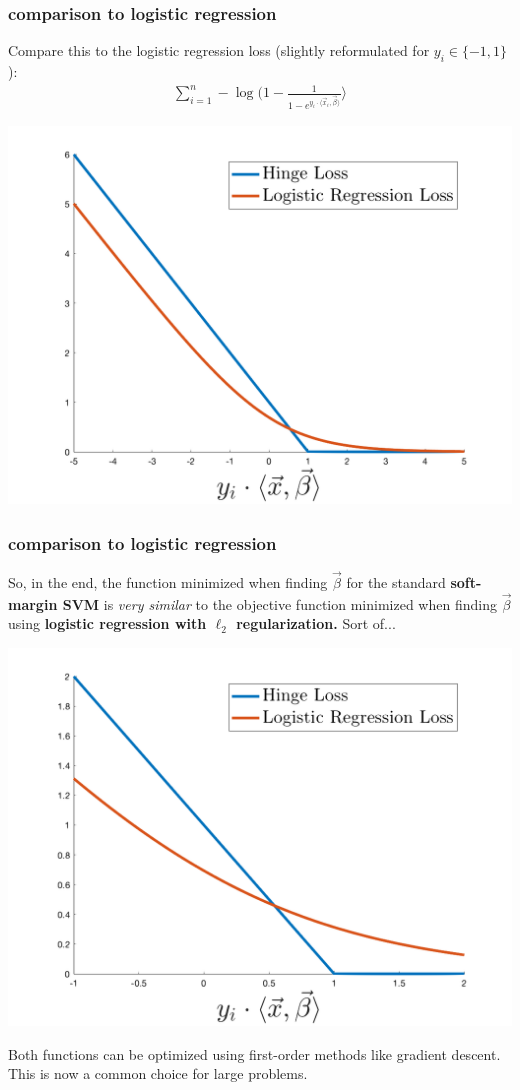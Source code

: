 \documentclass[handout,compress]{beamer}
\begin{document}
\begin{frame}
	\frametitle{comparison to logistic regression}
	Compare this to the logistic regression loss (slightly reformulated for $y_i\in \{-1,1\}$): 
	\begin{align*}
	\sum_{i=1}^n -\log(1 - \frac{1}{1-e^{y_i\cdot\langle \vec{x}_i, \vec{\beta}\rangle}}\rangle
	\end{align*}
	\begin{center}
		\vspace{-1em}
		\includegraphics[width =.6\textwidth]{hinge_vs_log.png}
	\end{center}
\end{frame}

\begin{frame}
	\frametitle{comparison to logistic regression}
	So, in the end, the function minimized when finding $\vec{\beta}$ for the standard \textbf{soft-margin SVM} is \emph{very similar} to the objective function minimized when finding $\vec{\beta}$ using \textbf{logistic regression with $\ell_2$ regularization.} Sort of...
	\begin{center}
		\vspace{-1em}
		\includegraphics[width =.4\textwidth]{zoomed_in.png}
	\end{center}
	Both functions can be optimized using first-order methods like gradient descent. This is now a common choice for large problems.
\end{frame}
\end{document}
